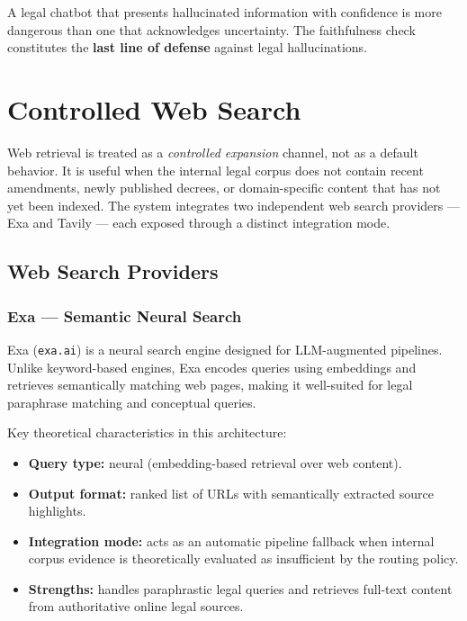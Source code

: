 \documentclass[12pt, a4paper]{article}
\begin{document}
\begin{warningbox}
A legal chatbot that presents hallucinated information with confidence is more
dangerous than one that acknowledges uncertainty. The faithfulness check
constitutes the \textbf{last line of defense} against legal hallucinations.
\end{warningbox}

\section{Controlled Web Search}
\label{sec:websearch}

Web retrieval is treated as a \textit{controlled expansion} channel, not as a
default behavior. It is useful when the internal legal corpus does not contain
recent amendments, newly published decrees, or domain-specific content that has
not yet been indexed. The system integrates two independent web search providers
--- Exa and Tavily --- each exposed through a distinct integration mode.

\subsection{Web Search Providers}

\subsubsection{Exa --- Semantic Neural Search}

Exa (\texttt{exa.ai}) is a neural search engine designed for LLM-augmented
pipelines. Unlike keyword-based engines, Exa encodes queries using embeddings
and retrieves semantically matching web pages, making it well-suited for legal
paraphrase matching and conceptual queries.

Key theoretical characteristics in this architecture:
\begin{itemize}[leftmargin=1.8em, itemsep=0.2em]
  \item \textbf{Query type:} neural (embedding-based retrieval over web content).
  \item \textbf{Output format:} ranked list of URLs with semantically extracted source highlights.
  \item \textbf{Integration mode:} acts as an automatic pipeline fallback when internal
        corpus evidence is theoretically evaluated as insufficient by the routing policy.
  \item \textbf{Strengths:} handles paraphrastic legal queries and retrieves
        full-text content from authoritative online legal sources.
\end{itemize}
\end{document}
